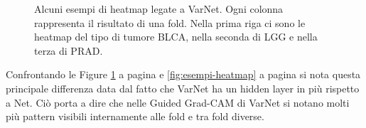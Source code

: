 \begin{figure}[h!]
		 \hfill %
		 \hfill %
		 \hfill %
		 \hfill %
		 \hfill %
		\caption{Alcuni esempi di heatmap legate a VarNet. Ogni colonna rappresenta il risultato di una fold. Nella prima riga ci sono le heatmap %
					del tipo di tumore BLCA, nella seconda di LGG e nella terza di PRAD.}
		\label{fig:esempi-heatmap-varnet}
	\end{figure}
Confrontando le Figure \ref{fig:esempi-heatmap-varnet} a pagina \pageref{fig:esempi-heatmap-varnet} e 
\ref{fig:esempi-heatmap} a pagina \pageref{fig:esempi-heatmap} si nota questa principale differenza
data dal fatto che VarNet ha un hidden layer in più rispetto a Net. Ciò porta a dire che nelle Guided Grad-CAM di
VarNet si notano molti più pattern visibili internamente alle fold e tra fold diverse.
